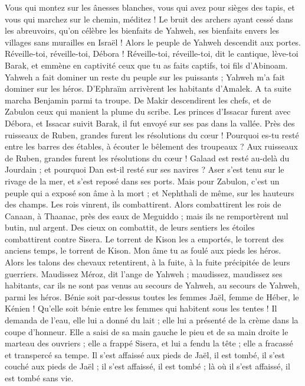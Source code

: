 \begin{multicols}{2}
Vous qui montez sur les ânesses blanches, vous qui avez pour sièges des tapis, et vous qui marchez sur le chemin, méditez !
Le bruit des archers ayant cessé dans les abreuvoirs, qu'on célèbre les bienfaits de Yahweh, ses bienfaits envers les villages sans murailles en Israël ! Alors le peuple de Yahweh descendit aux portes.
Réveille-toi, réveille-toi, Débora !  Réveille-toi, réveille-toi, dit le cantique, lève-toi Barak, et emmène en captivité ceux que tu as faits captifs, toi fils d'Abinoam.
Yahweh a fait dominer un reste du peuple sur les puissants ; Yahweh m'a fait dominer sur les héros.
D'Ephraïm arrivèrent les habitants d'Amalek. A ta suite marcha Benjamin parmi ta troupe. De Makir descendirent les chefs,  et de Zabulon ceux qui manient la plume du scribe.
Les princes d'Issacar furent avec Débora, et Issacar suivit Barak, il fut envoyé sur ses pas dans la vallée.  Près des ruisseaux de Ruben, grandes furent les résolutions du cœur !
Pourquoi es-tu resté entre les barres des étables, à écouter le bêlement des troupeaux ? Aux ruisseaux de Ruben, grandes furent les résolutions du cœur !
Galaad est resté au-delà du Jourdain ; et pourquoi Dan est-il resté sur ses navires ? Aser s'est tenu sur le rivage de la mer, et s’est reposé dans ses ports.
Mais pour Zabulon, c'est un peuple qui a exposé son âme à la mort ; et Nephthali de même, sur les hauteurs des champs.
Les rois vinrent,  ils combattirent. Alors combattirent les rois de Canaan, à Thaanac, près des eaux de Meguiddo ; mais ils ne remportèrent nul butin, nul argent.
Des cieux on combattit, de leurs sentiers les étoiles combattirent contre Sisera.
Le torrent de Kison les a emportés, le torrent des anciens temps, le torrent de Kison. Mon âme tu as foulé aux pieds les héros.
Alors les talons des chevaux retentirent, à la fuite, à la fuite précipitée de leurs guerriers.
Maudissez Méroz, dit l'ange de Yahweh ; maudissez, maudissez ses habitants, car ils ne sont pas venus au secours de Yahweh, au secours de Yahweh, parmi les héros.
Bénie soit par-dessus toutes les femmes Jaël, femme de Héber, le Kénien ! Qu'elle soit bénie entre les femmes qui habitent sous les tentes !
Il demanda de l'eau, elle lui a donné du lait ; elle lui a présenté de la crème dans la coupe d'honneur.
Elle a saisi de sa main gauche le pieu et de sa main droite le marteau des ouvriers ; elle a frappé Sisera, et lui a fendu la tête ; elle a fracassé et transpercé sa tempe.
Il s'est affaissé aux pieds de Jaël, il est tombé, il s’est couché aux pieds de Jaël ; il s'est affaissé, il est tombé ; là où il s'est affaissé, il est tombé sans vie.

\end{multicols}
